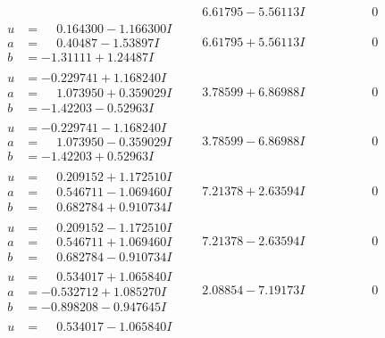 \documentclass[1p]{elsarticle_modified}
\theoremstyle{definition}
\begin{document}
$$\begin{array}{c|c|c}
 & \phantom{-}6.61795 - 5.56113 I & \phantom{-0.000000 } 0 \\ \hline\begin{aligned}
u &= \phantom{-}0.164300 - 1.166300 I \\
a &= \phantom{-}0.40487 - 1.53897 I \\
b &= -1.31111 + 1.24487 I\end{aligned}
 & \phantom{-}6.61795 + 5.56113 I & \phantom{-0.000000 } 0 \\ \hline\begin{aligned}
u &= -0.229741 + 1.168240 I \\
a &= \phantom{-}1.073950 + 0.359029 I \\
b &= -1.42203 - 0.52963 I\end{aligned}
 & \phantom{-}3.78599 + 6.86988 I & \phantom{-0.000000 } 0 \\ \hline\begin{aligned}
u &= -0.229741 - 1.168240 I \\
a &= \phantom{-}1.073950 - 0.359029 I \\
b &= -1.42203 + 0.52963 I\end{aligned}
 & \phantom{-}3.78599 - 6.86988 I & \phantom{-0.000000 } 0 \\ \hline\begin{aligned}
u &= \phantom{-}0.209152 + 1.172510 I \\
a &= \phantom{-}0.546711 - 1.069460 I \\
b &= \phantom{-}0.682784 + 0.910734 I\end{aligned}
 & \phantom{-}7.21378 + 2.63594 I & \phantom{-0.000000 } 0 \\ \hline\begin{aligned}
u &= \phantom{-}0.209152 - 1.172510 I \\
a &= \phantom{-}0.546711 + 1.069460 I \\
b &= \phantom{-}0.682784 - 0.910734 I\end{aligned}
 & \phantom{-}7.21378 - 2.63594 I & \phantom{-0.000000 } 0 \\ \hline\begin{aligned}
u &= \phantom{-}0.534017 + 1.065840 I \\
a &= -0.532712 + 1.085270 I \\
b &= -0.898208 - 0.947645 I\end{aligned}
 & \phantom{-}2.08854 - 7.19173 I & \phantom{-0.000000 } 0 \\ \hline\begin{aligned}
u &= \phantom{-}0.534017 - 1.065840 I \\

\end{aligned}
\end{array}$$
\end{document}
